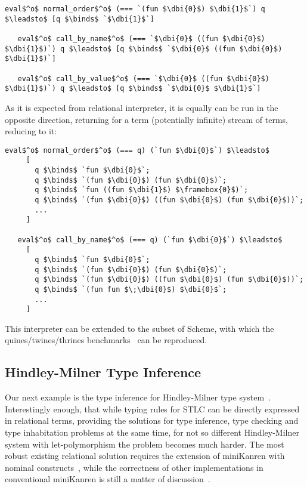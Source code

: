 \begin{lstlisting}[basicstyle=\small]
   eval$^o$ normal_order$^o$ (=== `(fun $\dbi{0}$) $\dbi{1}$`) q $\leadsto$ [q $\binds$ `$\dbi{1}$`]
   
   eval$^o$ call_by_name$^o$ (=== `$\dbi{0}$ ((fun $\dbi{0}$) $\dbi{1}$)`) q $\leadsto$ [q $\binds$ `$\dbi{0}$ ((fun $\dbi{0}$) $\dbi{1}$)`]   

   eval$^o$ call_by_value$^o$ (=== `$\dbi{0}$ ((fun $\dbi{0}$) $\dbi{1}$)`) q $\leadsto$ [q $\binds$ `$\dbi{0}$ $\dbi{1}$`] 
\end{lstlisting}

As it is expected from relational interpreter, it is equally can be run in the opposite direction, returning for a term (potentially infinite) stream
of terms, reducing to it:

\begin{lstlisting}[basicstyle=\small]
   eval$^o$ normal_order$^o$ (=== q) (`fun $\dbi{0}$`) $\leadsto$ 
     [
       q $\binds$ `fun $\dbi{0}$`; 
       q $\binds$ `(fun $\dbi{0}$) (fun $\dbi{0}$)`; 
       q $\binds$ `fun ((fun $\dbi{1}$) $\framebox{0}$)`; 
       q $\binds$ `(fun $\dbi{0}$) ((fun $\dbi{0}$) (fun $\dbi{0}$))`;  
       ...
     ] 

   eval$^o$ call_by_name$^o$ (=== q) (`fun $\dbi{0}$`) $\leadsto$ 
     [
       q $\binds$ `fun $\dbi{0}$`; 
       q $\binds$ `(fun $\dbi{0}$) (fun $\dbi{0}$)`; 
       q $\binds$ `(fun $\dbi{0}$) ((fun $\dbi{0}$) (fun $\dbi{0}$))`; 
       q $\binds$ `(fun fun $\;\dbi{0}$) $\dbi{0}$`; 
       ...
     ] 
\end{lstlisting}

This interpreter can be extended to the subset of Scheme, with which the quines/twines/thrines benchmarks~\cite{Untagged} can be
reproduced.

\subsection{Hindley-Milner Type Inference}

Our next example is the type inference for Hindley-Milner type system~\cite{Types}. Interestingly enough, that while typing rules for
STLC can be directly expressed in relational terms, providing the solutions for type inference, type checking and type inhabitation
problems at the same time, for not so different Hindley-Milner system with let-polymorphism the problem becomes much
harder. The most robust existing relational solution requires the extension of miniKanren with nominal constructs~\cite{alphaKanren}, while
the correctness of other implementations in conventional miniKanren is still a matter of discussion~\cite{WillOnHM}.

